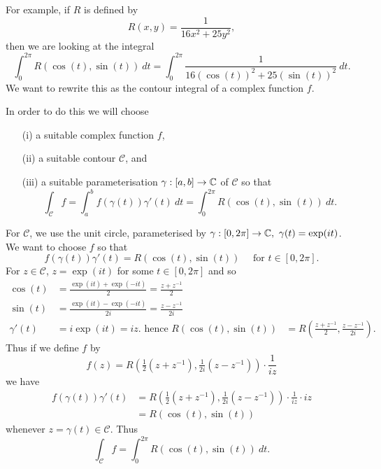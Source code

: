 For example, if $R$ is defined by
\[
R(x,y) = \frac{1}{16x^2+25y^2},
\]
then we are looking at the integral
\[
\int_0^{2\pi} R(\cos (t) , \sin (t) )\ dt = \int_0^{2\pi} \frac{1}{16 \left( \cos (t) \right)^2+25 \left( \sin (t) \right)^2}\ dt.
\]
 We want to rewrite this as the contour integral of a complex function $f$.


  In order to do this we will choose
\begin{enumerate}
\item[(i)] a suitable complex function $f$,
\item[(ii)] a suitable contour $\mathcal{C}$, and
\item[(iii)] a suitable parameterisation $\gamma: [a,b] \to \mathbb{C}$ of $\mathcal{C}$ so that
\[
\int_{\mathcal{C}} f = \int_a^b f \left( \gamma (t) \right) \gamma' (t)\ dt = \int_0^{2\pi} R( \cos (t) , \sin (t))\ dt.
\]
\end{enumerate}
For $\mathcal{C}$, we use the unit circle, parameterised by $\gamma:[0,2\pi] \to \mathbb{C},\ \gamma(t) = \exp(it)$.  We want to choose $f$ so that
\[
f( \gamma(t)) \gamma'(t) = R( \cos(t),\sin(t) ) \quad \text{ for } t \in [0,2\pi].
\]
 For $z \in \mathcal{C}$, $z= \exp(it)$ for some $t \in [0,2\pi]$ and so
\begin{align*}
\cos(t) & = \frac{\exp(it)+\exp(-it)}{2}  = \frac{z+z^{-1}}{2} \\
\sin(t) & = \frac{\exp(it)-\exp(-it)}{2i} =  \frac{z-z^{-1}}{2i} \\
\gamma'(t) & = i \exp(it) = iz.
\mbox{ hence }
 R ( \cos (t), \sin (t) )  &= R \left( \frac{z+z^{-1}}{2}, \frac{z-z^{-1}}{2i} \right).
\end{align*}
Thus if we define $f$ by 
\[
f(z) = R \left( \tfrac{1}{2}(z+z^{-1}),\tfrac{1}{2i}(z-z^{-1}) \right) \cdot \frac{1}{iz}
\]
we have
\begin{align*}
f( \gamma(t)) \gamma'(t) & = R \left( \tfrac{1}{2}(z+z^{-1}),\tfrac{1}{2i}(z-z^{-1}) \right) \cdot \frac{1}{iz} \cdot iz \\
&= R( \cos(t),\sin(t) ) 
\end{align*}
whenever $z = \gamma(t) \in \mathcal{C}$.
Thus
\[
\int_{\mathcal{C}} f = \int_0^{2\pi} R \left( \cos(t) , \sin (t) \right)\ dt.
\]
